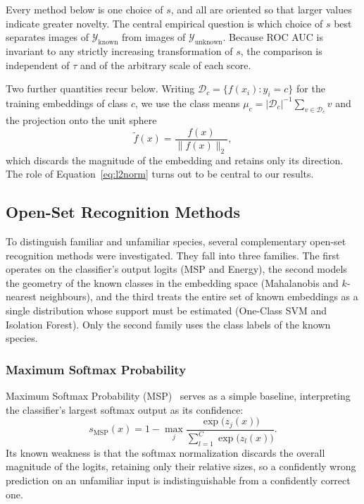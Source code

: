 \documentclass[11pt]{article}
\begin{document}
Every method below is one choice of $s$, and all are oriented so that larger values indicate greater novelty. The central empirical question is which choice of $s$ best separates images of $\mathcal{Y}_{\text{known}}$ from images of $\mathcal{Y}_{\text{unknown}}$. Because ROC AUC is invariant to any strictly increasing transformation of $s$, the comparison is independent of $\tau$ and of the arbitrary scale of each score.

Two further quantities recur below. Writing $\mathcal{D}_c = \{f(x_i) : y_i = c\}$ for the training embeddings of class $c$, we use the class means $\mu_c = |\mathcal{D}_c|^{-1} \sum_{v \in \mathcal{D}_c} v$ and the projection onto the unit sphere
\begin{equation}
\tilde{f}(x) = \frac{f(x)}{\lVert f(x) \rVert_2},
\label{eq:l2norm}
\end{equation}
which discards the magnitude of the embedding and retains only its direction. The role of Equation~\eqref{eq:l2norm} turns out to be central to our results.

\subsection{Open-Set Recognition Methods}

To distinguish familiar and unfamiliar species, several complementary open-set recognition methods were investigated. They fall into three families. The first operates on the classifier's output logits (MSP and Energy), the second models the geometry of the known classes in the embedding space (Mahalanobis and $k$-nearest neighbours), and the third treats the entire set of known embeddings as a single distribution whose support must be estimated (One-Class SVM and Isolation Forest). Only the second family uses the class labels of the known species.

\subsubsection{Maximum Softmax Probability}

Maximum Softmax Probability (MSP)~\cite{hendrycks2017baseline} serves as a simple baseline, interpreting the classifier's largest softmax output as its confidence:
\begin{equation}
s_{\text{MSP}}(x) = 1 - \max_{j} \frac{\exp\!\big(z_j(x)\big)}{\sum_{l=1}^{C} \exp\!\big(z_l(x)\big)}.
\end{equation}
Its known weakness is that the softmax normalization discards the overall magnitude of the logits, retaining only their relative sizes, so a confidently wrong prediction on an unfamiliar input is indistinguishable from a confidently correct one.
\end{document}
